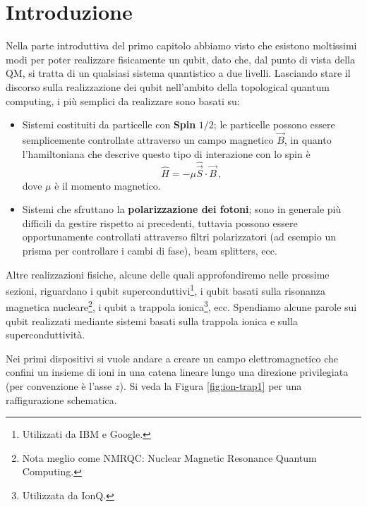 \section{Introduzione}
Nella parte introduttiva del primo capitolo abbiamo visto che esistono moltissimi modi per poter realizzare fisicamente un qubit, dato che, dal punto di vista della QM, si tratta di un qualsiasi sistema quantistico a due livelli. Lasciando stare il discorso sulla realizzazione dei qubit nell'ambito della topological quantum computing, i più semplici da realizzare sono basati su:
\begin{itemize}
    \item Sistemi costituiti da particelle con \textbf{Spin} $1/2$; le particelle possono essere semplicemente controllate attraverso un campo magnetico $\vec B$, in quanto l'hamiltoniana che descrive questo tipo di interazione con lo spin è
    \begin{equation*}
        \hat H = - \mu \hat{\vec S} \cdot \vec B \, ,
    \end{equation*}
    dove $\mu$ è il momento magnetico.
    
    \item Sistemi che sfruttano la \textbf{polarizzazione dei fotoni}; sono in generale più difficili da gestire rispetto ai precedenti, tuttavia possono essere opportunamente controllati attraverso filtri polarizzatori (ad esempio un prisma per controllare i cambi di fase), beam splitters, ecc.
\end{itemize}

\noindent Altre realizzazioni fisiche, alcune delle quali approfondiremo nelle prossime sezioni, riguardano i qubit superconduttivi\footnote{Utilizzati da IBM e Google.}, i qubit basati sulla risonanza magnetica nucleare\footnote{Nota meglio come NMRQC: Nuclear Magnetic Resonance Quantum Computing.}, i qubit a trappola ionica\footnote{Utilizzata da IonQ.}, ecc. Spendiamo alcune parole sui qubit realizzati mediante sistemi basati sulla trappola ionica e sulla superconduttività. 

\noindent Nei primi dispositivi si vuole andare a creare un campo elettromagnetico che confini un insieme di ioni in una catena lineare lungo una direzione privilegiata (per convenzione è l'asse $z$). Si veda la Figura \ref{fig:ion-trap1} per una raffigurazione schematica. 

